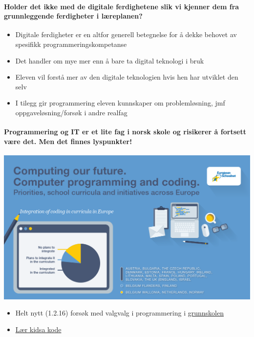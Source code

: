 \documentclass[%
oneside,                 %
final,                   %
10pt]{article}
\begin{document}
\noindent


\paragraph{Holder det ikke med de digitale ferdighetene slik vi kjenner dem fra grunnleggende ferdigheter i læreplanen?}
\begin{itemize}
\item Digitale ferdigheter er en altfor generell betegnelse for å dekke behovet av spesifikk programmeringskompetanse

\item Det handler om mye mer enn å bare ta digital teknologi i bruk

\item Eleven vil forstå mer av den digitale teknologien hvis hen har utviklet den selv

\item I tilegg gir programmering eleven kunnskaper om problemløsning, jmf oppgaveløsning/forsøk i andre realfag
\end{itemize}

\noindent



\paragraph{Programmering og IT er et lite fag i norsk skole og risikerer å fortsett være det. Men det finnes lyspunkter!}
\centerline{\includegraphics[width=0.9\linewidth]{fig/computing_our_future.png}}



\begin{itemize}
\item Helt nytt (1.2.16) forsøk med valgvalg i programmering i \href{{http://www.udir.no/Lareplaner/Forsok-og-pagaende-arbeid/forsok-med-programmering-som-valgfag}}{grunnskolen}

\item \href{{http://kidsakoder.no}}{Lær kidsa kode}
\end{itemize}
\end{document}
